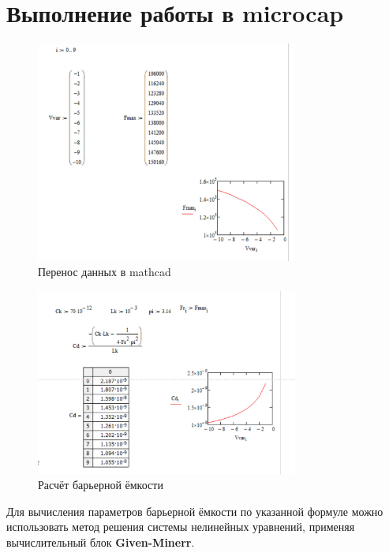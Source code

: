 \section{Выполнение работы в microcap}

\begin{figure}[H]
	\centering
	\includegraphics[width=0.77\textwidth]{img/08.jpg}
	\captionsetup{font=footnotesize}
	\caption{Перенос данных в mathcad}
	\label{fig:08}
\end{figure}

\begin{figure}[H]
	\centering
	\includegraphics[width=0.77\textwidth]{img/09.jpg}
	\captionsetup{font=footnotesize}
	\caption{Расчёт барьерной ёмкости}
	\label{fig:09}
\end{figure}

Для вычисления параметров барьерной ёмкости по указанной формуле можно использовать метод решения системы нелинейных уравнений, применяя вычислительный блок \textbf{Given-Minerr}.

